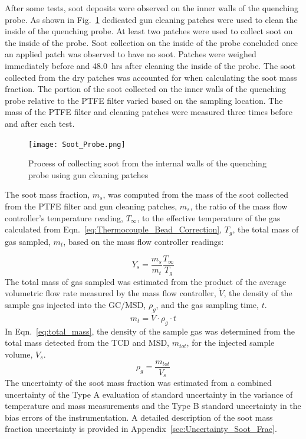\documentclass[12pt]{article}
\begin{document}
After some tests, soot deposits were observed on the inner walls of the quenching probe. As shown in Fig.~\ref{fig:Soot_Probe_Setup} dedicated gun cleaning patches were used to clean the inside of the quenching probe. At least two patches were used to collect soot on the inside of the probe. Soot collection on the inside of the probe concluded once an applied patch was observed to have no soot. Patches were weighed immediately before and \SI{48.0}{hrs} after cleaning the inside of the probe. The soot collected from the dry patches was accounted for when calculating the soot mass fraction. The portion of the soot collected on the inner walls of the quenching probe relative to the PTFE filter varied based on the sampling location. The mass of the PTFE filter and cleaning patches were measured three times before and after each test.

\begin{figure}[ht!]
	\centering
\texttt{[image: Soot\_Probe.png]}
	\caption[Process for cleaning soot probe]{Process of collecting soot from the internal walls of the quenching probe using gun cleaning patches}
	\label{fig:Soot_Probe_Setup}
\end{figure}

The soot mass fraction, $m_{s}$, was computed from the mass of the soot collected from the PTFE filter and gun cleaning patches, $m_{s}$, the ratio of the mass flow controller's temperature reading, $T_{\infty}$, to the effective temperature of the gas calculated from Eqn.~\ref{eq:Thermocouple_Bead_Correction}, $T_{g}$, the total mass of gas sampled, $m_{t}$, based on the mass flow controller readings:

\begin{equation}\label{eq:soot_mass_frac}
Y_{s}= \frac{m_{s}}{m_{t}}\frac{T_{\infty}}{T_{g}}
\end{equation}
The total mass of gas sampled was estimated from the product of the average volumetric flow rate measured by the mass flow controller, $\dot{V}$, the density of the sample gas injected into the GC/MSD, $\rho_{g}$, and the gas sampling time, $t$. 
\begin{equation}\label{eq:total_mass}
m_{t}= \dot{V}\cdot \rho_{g}\cdot t
\end{equation} 
In Eqn.~\ref{eq:total_mass}, the density of the sample gas was determined from the total mass detected from the TCD and MSD, $m_{tot}$, for the injected sample volume, $V_{s}$. 
\begin{equation}\label{eq:gas_density}
\rho_{g}= \frac{m_{tot}}{V_{s}}
\end{equation} 
The uncertainty of the soot mass fraction was estimated from a combined uncertainty of the Type A evaluation of standard uncertainty in the variance of temperature and mass measurements and the Type B standard uncertainty in the bias errors of the instrumentation. A detailed description of the soot mass fraction uncertainty is provided in Appendix~\ref{sec:Uncertainty_Soot_Frac}.
\end{document}
